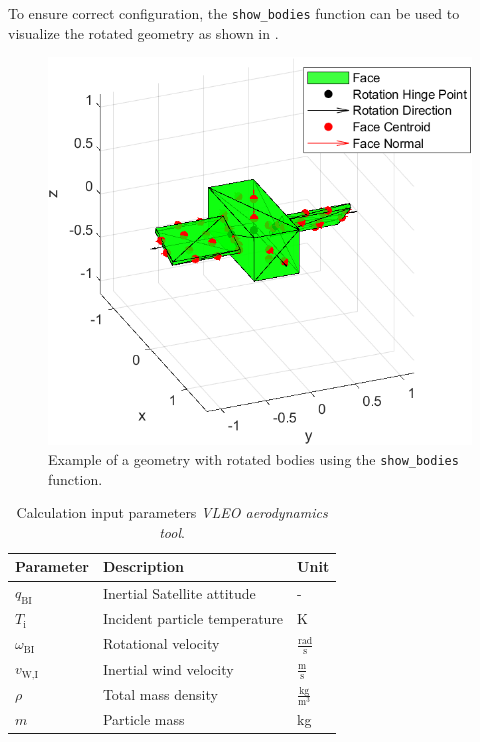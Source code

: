 \documentclass[pdflatex,sn-mathphys-num]{sn-jnl}%
\theoremstyle{thmstyleone}%
\theoremstyle{thmstyletwo}%
\theoremstyle{thmstylethree}%
\begin{document}
	To ensure correct configuration, the \texttt{show\_bodies} function can be used to visualize the rotated geometry as shown in .
    \begin{figure}[h]
		\centering
		\includegraphics[width=.6\textwidth]{Figures/fig7.png}
		\caption{Example of a geometry with rotated bodies using the \texttt{show\_bodies} function.}
			\label{fig:aerodynamics_tool_show_bodies}
	\end{figure}

	\begin{table}[h]
		\centering
		\caption{Calculation input parameters \textit{VLEO aerodynamics tool}.}
		\begin{tabular}{lll}
			Parameter & Description & Unit \\
			\hline
			$q_{\text{BI}}$ & Inertial Satellite attitude & -\\
			$T_{\text{i}}$ & Incident particle temperature & K\\
			$\omega_{\text{BI}}$ & Rotational velocity & $\frac{\text{rad}}{\text{s}}$\\
			$v_{\text{W,I}}$& Inertial wind velocity &  $\frac{\text{m}}{\text{s}}$\\
			$\rho$ & Total mass density & $\frac{\text{kg}}{\text{m}^3}$\\
			$m$& Particle mass  & kg \\
		\end{tabular}
		\label{tab:aerodynamics_tool_calc_input}
	\end{table}
\end{document}

